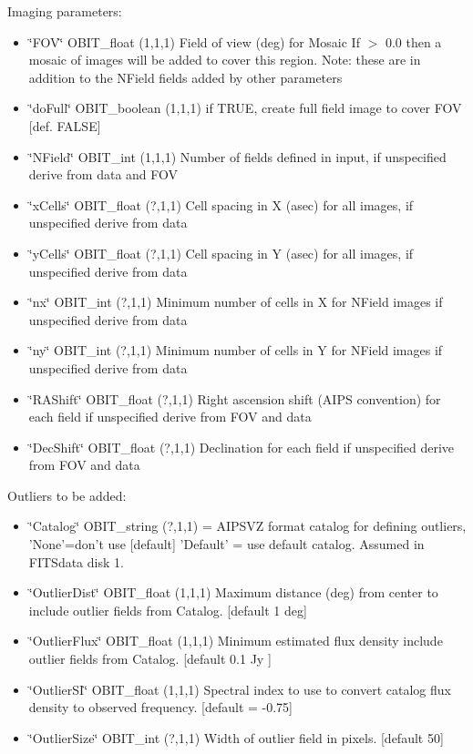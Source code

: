 Imaging parameters: \begin{itemize}
\item \char`\"{}FOV\char`\"{} OBIT\_\-float (1,1,1) Field of view (deg) for Mosaic If $>$ 0.0 then a mosaic of images will be added to cover this region. Note: these are in addition to the NField fields added by other parameters \item \char`\"{}do\-Full\char`\"{} OBIT\_\-boolean (1,1,1) if TRUE, create full field image to cover FOV [def. FALSE] \item \char`\"{}NField\char`\"{} OBIT\_\-int (1,1,1) Number of fields defined in input, if unspecified derive from data and FOV \item \char`\"{}x\-Cells\char`\"{} OBIT\_\-float (?,1,1) Cell spacing in X (asec) for all images, if unspecified derive from data \item \char`\"{}y\-Cells\char`\"{} OBIT\_\-float (?,1,1) Cell spacing in Y (asec) for all images, if unspecified derive from data \item \char`\"{}nx\char`\"{} OBIT\_\-int (?,1,1) Minimum number of cells in X for NField images if unspecified derive from data \item \char`\"{}ny\char`\"{} OBIT\_\-int (?,1,1) Minimum number of cells in Y for NField images if unspecified derive from data \item \char`\"{}RAShift\char`\"{} OBIT\_\-float (?,1,1) Right ascension shift (AIPS convention) for each field if unspecified derive from FOV and data \item \char`\"{}Dec\-Shift\char`\"{} OBIT\_\-float (?,1,1) Declination for each field if unspecified derive from FOV and data\end{itemize}
Outliers to be added: \begin{itemize}
\item \char`\"{}Catalog\char`\"{} OBIT\_\-string (?,1,1) = AIPSVZ format catalog for defining outliers, 'None'=don't use [default] 'Default' = use default catalog. Assumed in FITSdata disk 1. \item \char`\"{}Outlier\-Dist\char`\"{} OBIT\_\-float (1,1,1) Maximum distance (deg) from center to include outlier fields from Catalog. [default 1 deg] \item \char`\"{}Outlier\-Flux\char`\"{} OBIT\_\-float (1,1,1) Minimum estimated flux density include outlier fields from Catalog. [default 0.1 Jy ] \item \char`\"{}Outlier\-SI\char`\"{} OBIT\_\-float (1,1,1) Spectral index to use to convert catalog flux density to observed frequency. [default = -0.75] \item \char`\"{}Outlier\-Size\char`\"{} OBIT\_\-int (?,1,1) Width of outlier field in pixels. [default 50]\end{itemize}
